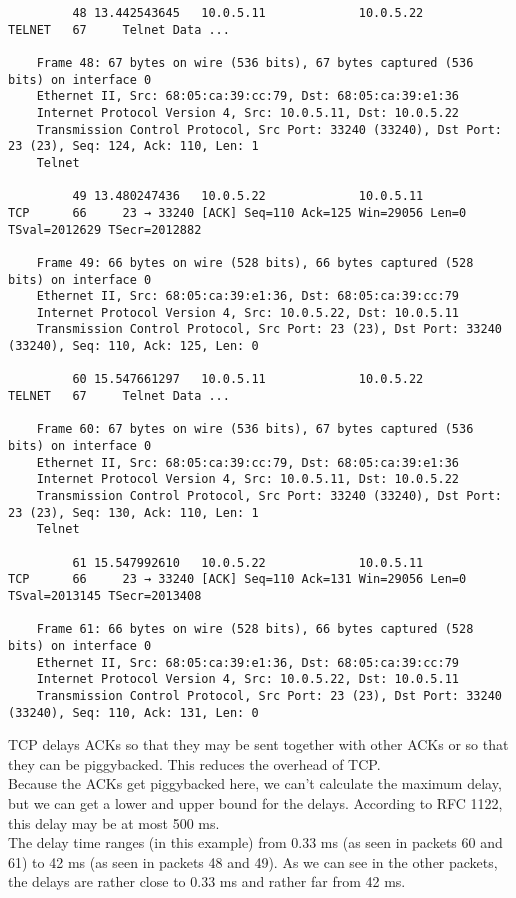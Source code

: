 \begin{verbatim}
		 48 13.442543645   10.0.5.11             10.0.5.22             TELNET   67     Telnet Data ...

	Frame 48: 67 bytes on wire (536 bits), 67 bytes captured (536 bits) on interface 0
	Ethernet II, Src: 68:05:ca:39:cc:79, Dst: 68:05:ca:39:e1:36
	Internet Protocol Version 4, Src: 10.0.5.11, Dst: 10.0.5.22
	Transmission Control Protocol, Src Port: 33240 (33240), Dst Port: 23 (23), Seq: 124, Ack: 110, Len: 1
	Telnet

		 49 13.480247436   10.0.5.22             10.0.5.11             TCP      66     23 → 33240 [ACK] Seq=110 Ack=125 Win=29056 Len=0 TSval=2012629 TSecr=2012882

	Frame 49: 66 bytes on wire (528 bits), 66 bytes captured (528 bits) on interface 0
	Ethernet II, Src: 68:05:ca:39:e1:36, Dst: 68:05:ca:39:cc:79
	Internet Protocol Version 4, Src: 10.0.5.22, Dst: 10.0.5.11
	Transmission Control Protocol, Src Port: 23 (23), Dst Port: 33240 (33240), Seq: 110, Ack: 125, Len: 0

		 60 15.547661297   10.0.5.11             10.0.5.22             TELNET   67     Telnet Data ...

	Frame 60: 67 bytes on wire (536 bits), 67 bytes captured (536 bits) on interface 0
	Ethernet II, Src: 68:05:ca:39:cc:79, Dst: 68:05:ca:39:e1:36
	Internet Protocol Version 4, Src: 10.0.5.11, Dst: 10.0.5.22
	Transmission Control Protocol, Src Port: 33240 (33240), Dst Port: 23 (23), Seq: 130, Ack: 110, Len: 1
	Telnet

		 61 15.547992610   10.0.5.22             10.0.5.11             TCP      66     23 → 33240 [ACK] Seq=110 Ack=131 Win=29056 Len=0 TSval=2013145 TSecr=2013408

	Frame 61: 66 bytes on wire (528 bits), 66 bytes captured (528 bits) on interface 0
	Ethernet II, Src: 68:05:ca:39:e1:36, Dst: 68:05:ca:39:cc:79
	Internet Protocol Version 4, Src: 10.0.5.22, Dst: 10.0.5.11
	Transmission Control Protocol, Src Port: 23 (23), Dst Port: 33240 (33240), Seq: 110, Ack: 131, Len: 0
\end{verbatim}

TCP delays ACKs so that they may be sent together with other ACKs or so that they can be piggybacked. This reduces the overhead of TCP. \\
Because the ACKs get piggybacked here, we can't calculate the maximum delay, but we can get a lower and upper bound for the delays.
According to RFC 1122, this delay may be at most 500 ms. \\
The delay time ranges (in this example) from 0.33 ms (as seen in packets 60 and 61) to 42 ms (as seen in packets 48 and 49).
As we can see in the other packets, the delays are rather close to 0.33 ms and rather far from 42 ms.